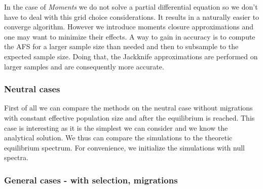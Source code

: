 In the case of \textit{Moments} we do not solve a partial differential equation so we don't have to deal with this grid choice considerations. It results in a naturally easier to converge algorithm. However we introduce moments closure approximations and one may want to minimize their effects. A way to gain in accuracy is to compute the AFS for a larger sample size than needed and then to subsample to the expected sample size. Doing that, the Jackknife approximations are performed on larger samples and are consequently more accurate.

\subsubsection{Neutral cases}
First of all we can compare the methods on the neutral case without migrations with constant effective population size and after the equilibrium is reached.
This case is interesting as it is the simplest we can consider and we know the analytical solution. We thus can compare the simulations to the theoretic equilibrium spectrum. For convenience, we initialize the simulations with null spectra.


\subsubsection{General cases - with selection, migrations}


